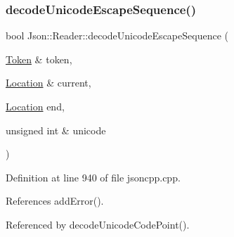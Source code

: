 \subsubsection{\texorpdfstring{decode\+Unicode\+Escape\+Sequence()}{decodeUnicodeEscapeSequence()}}
{\footnotesize\ttfamily bool Json\+::\+Reader\+::decode\+Unicode\+Escape\+Sequence (\begin{DoxyParamCaption}\item[{\hyperlink{class_json_1_1_reader_1_1_token}{Token} \&}]{token,  }\item[{\hyperlink{class_json_1_1_reader_a46795b5b272bf79a7730e406cb96375a}{Location} \&}]{current,  }\item[{\hyperlink{class_json_1_1_reader_a46795b5b272bf79a7730e406cb96375a}{Location}}]{end,  }\item[{unsigned int \&}]{unicode }\end{DoxyParamCaption})\hspace{0.3cm}{\ttfamily [private]}}



Definition at line 940 of file jsoncpp.\+cpp.



References add\+Error().



Referenced by decode\+Unicode\+Code\+Point().


